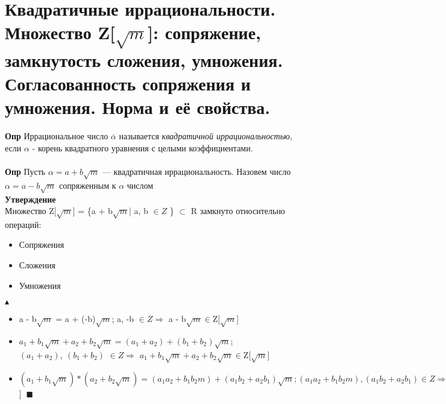 
\setcounter{section}{28}
\section{Квадратичные иррациональности. Множество Z[$\sqrt{m}$]: сопряжение, замкнутость сложения, умножения. Согласованность сопряжения и умножения. Норма и её свойства.}
\textbf{Опр} Иррациональное число $\overline{\alpha}$ называется \textit{квадратичной иррациональностью}, если $\alpha$ - корень квадратного уравнения с целыми коэффициентами.
\\
\\
\textbf{Опр} Пусть $\alpha = a + b\sqrt{m}$ — квадратичная иррациональность. Назовем число $\alpha = a - b\sqrt{m}$ сопряженным к $\alpha$ числом
\\
\textbf{Утверждение}\\
Множество Z[$\sqrt{m}$] = \{a + b$\sqrt{m}$| a, b $\in Z$ \} $\subset$ R замкнуто относительно операций:
\begin{itemize}
    \item[1] Сопряжения
    \item[2] Сложения
    \item[3] Умножения
\end{itemize}
$\blacktriangle$
\begin{itemize}
    \item[1] a - b$\sqrt{m}$ = a + (-b)$\sqrt{m}$;  a, -b $\in Z \Longrightarrow$ a - b$\sqrt{m} \in $Z[$\sqrt{m}$]
    \item[2] $a_1 + b_1\sqrt{m} + a_2 + b_2\sqrt{m} = (a_1 + a_2) + (b_1 + b_2)\sqrt{m}$; $(a_1 + a_2),\ (b_1 + b_2)$ $\in Z \Longrightarrow$ $a_1 + b_1\sqrt{m} + a_2 + b_2\sqrt{m} \in $Z[$\sqrt{m}$]
    \item[3] $(a_1 + b_1\sqrt{m}) *( a_2 + b_2\sqrt{m}) = (a_1 a_2 + b_1 b_2 m) + (a_1 b_2 + a_2 b_1)\sqrt{m}; (a_1 a_2 + b_1 b_2 m), (a_1 b_2 + a_2 b_1) \in Z \Longrightarrow (a_1 + b_1\sqrt{m}) *( a_2 + b_2\sqrt{m}) \in Z[\sqrt{m}$] $\ \blacksquare$
\end{itemize}

